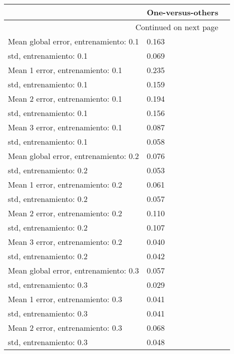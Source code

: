 \begin{longtable}{p{4cm}|p{1.5cm}|p{1.5cm}}
\toprule
{} &  One-versus-others \\
\midrule
\endhead
\midrule
\multicolumn{2}{r}{{Continued on next page}} \\
\midrule
\endfoot

\bottomrule
\endlastfoot
Mean global error, entrenamiento: 0.1 &              0.163 \\
std, entrenamiento: 0.1               &              0.069 \\
Mean 1 error, entrenamiento: 0.1      &              0.235 \\
std, entrenamiento: 0.1               &              0.159 \\
Mean 2 error, entrenamiento: 0.1      &              0.194 \\
std, entrenamiento: 0.1               &              0.156 \\
Mean 3 error, entrenamiento: 0.1      &              0.087 \\
std, entrenamiento: 0.1               &              0.058 \\
Mean global error, entrenamiento: 0.2 &              0.076 \\
std, entrenamiento: 0.2               &              0.053 \\
Mean 1 error, entrenamiento: 0.2      &              0.061 \\
std, entrenamiento: 0.2               &              0.057 \\
Mean 2 error, entrenamiento: 0.2      &              0.110 \\
std, entrenamiento: 0.2               &              0.107 \\
Mean 3 error, entrenamiento: 0.2      &              0.040 \\
std, entrenamiento: 0.2               &              0.042 \\
Mean global error, entrenamiento: 0.3 &              0.057 \\
std, entrenamiento: 0.3               &              0.029 \\
Mean 1 error, entrenamiento: 0.3      &              0.041 \\
std, entrenamiento: 0.3               &              0.041 \\
Mean 2 error, entrenamiento: 0.3      &              0.068 \\
std, entrenamiento: 0.3               &              0.048 \\

\end{longtable}
